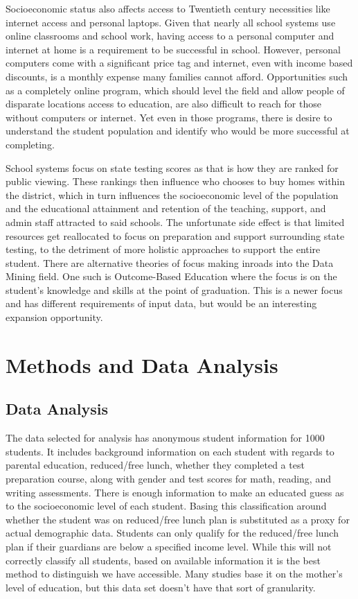 \documentclass[doc]{apa6} %
\begin{document}
Socioeconomic status also affects access to Twentieth century necessities like internet access and personal laptops. Given that nearly all school systems use online classrooms and school work, having access to a personal computer and internet at home is a requirement to be successful in school. However, personal computers come with a significant price tag and internet, even with income based discounts, is a monthly expense many families cannot afford.\cite{sesinternet} Opportunities such as a completely online program, which should level the field and allow people of disparate locations access to education, are also difficult to reach for those without computers or internet. Yet even in those programs, there is desire to understand the student population and identify who would be more successful at completing. \cite{DistLearnML}

School systems focus on state testing scores as that is how they are ranked for public viewing. \cite{linnetal} These rankings then influence who chooses to buy homes within the district, which in turn influences the socioeconomic level of the population and the educational attainment and retention of the teaching, support, and admin staff attracted to said schools. \cite{perry2010does} The unfortunate side effect is that limited resources get reallocated to focus on preparation and support surrounding state testing, to the detriment of more holistic approaches to support the entire student. \cite{cradle} There are alternative theories of focus making inroads into the Data Mining field. One such is Outcome-Based Education where the focus is on the student's knowledge and skills at the point of graduation. \cite{studentPerfOBE} This is a newer focus and has different requirements of input data, but would be an interesting expansion opportunity. 

\section{Methods and Data Analysis}
\subsection{Data Analysis}
The data selected for analysis has anonymous student information for 1000 students. It includes background information on each student with regards to parental education, reduced/free lunch, whether they completed a test preparation course, along with gender and test scores for math, reading, and writing assessments. There is enough information to make an educated guess as to the socioeconomic level of each student. Basing this classification around whether the student was on reduced/free lunch plan is substituted as a proxy for actual demographic data. Students can only qualify for the reduced/free lunch plan if their guardians are below a specified income level. While this will not correctly classify all students, based on available information it is the best method to distinguish we have accessible. Many studies base it on the mother's level of education, but this data set doesn't have that sort of granularity. \cite{maternaleducation} \cite{maternaleducation2} \cite{maternaleducation3}
\end{document}
